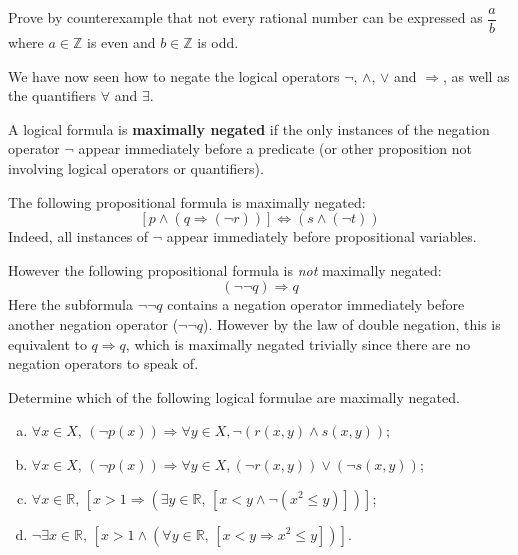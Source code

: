 \begin{exercise}
Prove by counterexample that not every rational number can be expressed as $\dfrac{a}{b}$ where $a \in \mathbb{Z}$ is even and $b \in \mathbb{Z}$ is odd.
\end{exercise}

We have now seen how to negate the logical operators $\neg$, $\wedge$, $\vee$ and $\Rightarrow$, as well as the quantifiers $\forall$ and $\exists$. 

\begin{definition}
\label{defMaximallyNegatedLogicalFormula}
A logical formula is \textbf{maximally negated} if the only instances of the negation operator $\neg$ appear immediately before a predicate (or other proposition not involving logical operators or quantifiers).
\end{definition}

\begin{example}
The following propositional formula is maximally negated:
\[ [p \wedge (q \Rightarrow (\neg r))] \Leftrightarrow (s \wedge (\neg t))\]
Indeed, all instances of $\neg$ appear immediately before propositional variables.

However the following propositional formula is \textit{not} maximally negated:
\[ (\neg \neg q) \Rightarrow q\]
Here the subformula $\neg \neg q$ contains a negation operator immediately before another negation operator ($\neg \neg q$). However by the law of double negation, this is equivalent to $q \Rightarrow q$, which is maximally negated trivially since there are no negation operators to speak of.
\end{example}

\begin{exercise}
Determine which of the following logical formulae are maximally negated.
\begin{enumerate}[(a)]
\item $\forall x \in X,\, (\neg p(x)) \Rightarrow \forall y \in X, \neg (r(x,y) \wedge s(x,y))$;
\item $\forall x \in X,\, (\neg p(x)) \Rightarrow \forall y \in X, (\neg r(x,y)) \vee (\neg s(x,y))$;
\item $\forall x \in \mathbb{R},\, [x > 1 \Rightarrow (\exists y \in \mathbb{R},\, [x < y \wedge \neg (x^2 \le y)])]$;
\item $\neg \exists x \in \mathbb{R},\, [x > 1 \wedge (\forall y \in \mathbb{R},\, [x < y \Rightarrow x^2 \le y])]$.
\end{enumerate}
\end{exercise}

